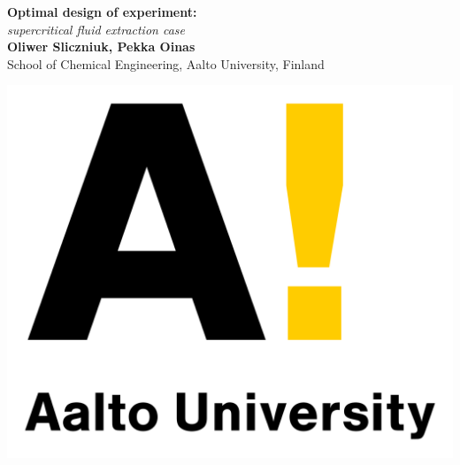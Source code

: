 \documentclass[a0,portrait]{a0poster}
\begin{document}
\pagecolor{white!90!black}


\begin{minipage}[b]{0.75\linewidth}
\veryHuge \color{NavyBlue} \textbf{Optimal design of experiment:} \color{Black}\\ %
\Huge\textit{supercritical fluid extraction case}\\[2cm] %
\huge \textbf{Oliwer Sliczniuk, Pekka Oinas}\\[0.5cm] %
\huge School of Chemical Engineering, Aalto University, Finland\\[0.4cm] %
\end{minipage}
%
\begin{minipage}[b]{0.25\linewidth}
\includegraphics[width=15cm]{Aalto_University_logo.png}\\ \\
\end{minipage}
\end{document}
